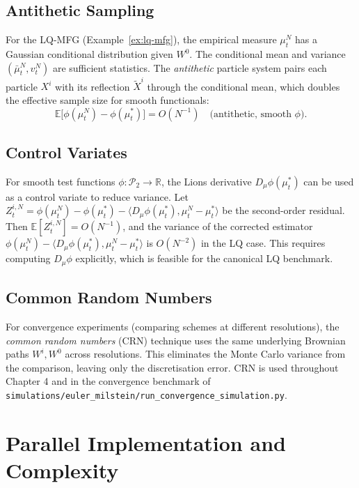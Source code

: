 \subsection{Antithetic Sampling}

For the LQ-MFG (Example~\ref{ex:lq-mfg}), the empirical measure $\mu_t^N$ has
a Gaussian conditional distribution given $W^0$. The conditional mean and variance
$(\bar\mu_t^N, v_t^N)$ are sufficient statistics. The \emph{antithetic} particle
system pairs each particle $X^i$ with its reflection $\tilde X^i$ through the
conditional mean, which doubles the effective sample size for smooth functionals:
\[
    \mathbb{E}\big[\phi(\mu_t^N) - \phi(\mu_t^*)\big] = O(N^{-1})
    \quad \text{(antithetic, smooth } \phi).
\]

\subsection{Control Variates}

For smooth test functions $\phi: \mathcal{P}_2 \to \mathbb{R}$, the Lions
derivative $D_\mu\phi(\mu_t^*)$ can be used as a control variate to reduce
variance. Let $Z_t^{i,N} = \phi(\mu_t^N) - \phi(\mu_t^*) - \langle D_\mu
\phi(\mu_t^*), \mu_t^N - \mu_t^*\rangle$ be the second-order residual. Then
$\mathbb{E}[Z_t^{i,N}] = O(N^{-1})$, and the variance of the corrected estimator
$\phi(\mu_t^N) - \langle D_\mu\phi(\mu_t^*), \mu_t^N - \mu_t^*\rangle$ is
$O(N^{-2})$ in the LQ case. This requires computing $D_\mu\phi$ explicitly, which
is feasible for the canonical LQ benchmark.

\subsection{Common Random Numbers}

For convergence experiments (comparing schemes at different resolutions), the
\emph{common random numbers} (CRN) technique uses the same underlying Brownian
paths $W^i, W^0$ across resolutions. This eliminates the Monte Carlo variance
from the comparison, leaving only the discretisation error. CRN is used throughout
Chapter 4 and in the convergence benchmark of
\texttt{simulations/euler\_milstein/run\_convergence\_simulation.py}.

\section{Parallel Implementation and Complexity}

